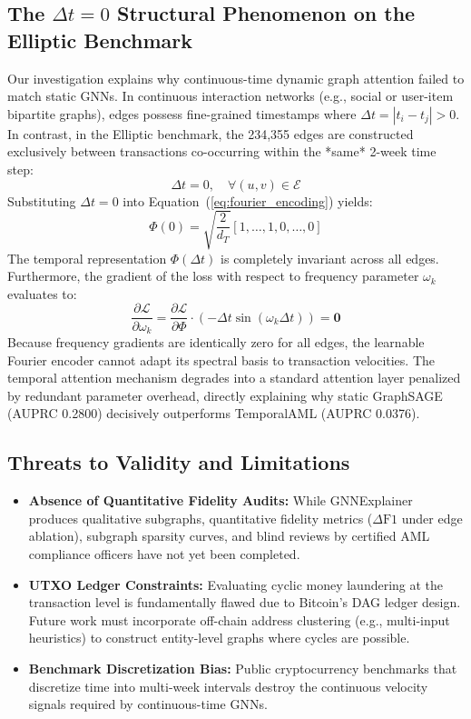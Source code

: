 \documentclass[conference]{IEEEtran}
\begin{document}
\subsection{The $\Delta t = 0$ Structural Phenomenon on the Elliptic Benchmark}
Our investigation explains why continuous-time dynamic graph attention failed to match static GNNs. In continuous interaction networks (e.g., social or user-item bipartite graphs), edges possess fine-grained timestamps where $\Delta t = |t_i - t_j| > 0$. In contrast, in the Elliptic benchmark, the 234,355 edges are constructed exclusively between transactions co-occurring within the *same* 2-week time step:
\begin{equation}
\Delta t = 0, \quad \forall (u, v) \in \mathcal{E}
\end{equation}
Substituting $\Delta t = 0$ into Equation~(\ref{eq:fourier_encoding}) yields:
\begin{equation}
\Phi(0) = \sqrt{\frac{2}{d_T}} [1, \dots, 1, 0, \dots, 0]
\end{equation}
The temporal representation $\Phi(\Delta t)$ is completely invariant across all edges. Furthermore, the gradient of the loss with respect to frequency parameter $\omega_k$ evaluates to:
\begin{equation}
\frac{\partial \mathcal{L}}{\partial \omega_k} = \frac{\partial \mathcal{L}}{\partial \Phi} \cdot \left( -\Delta t \sin(\omega_k \Delta t) \right) = \mathbf{0}
\end{equation}
Because frequency gradients are identically zero for all edges, the learnable Fourier encoder cannot adapt its spectral basis to transaction velocities. The temporal attention mechanism degrades into a standard attention layer penalized by redundant parameter overhead, directly explaining why static GraphSAGE (AUPRC 0.2800) decisively outperforms TemporalAML (AUPRC 0.0376).

\subsection{Threats to Validity and Limitations}
\begin{itemize}
    \item \textbf{Absence of Quantitative Fidelity Audits:} While GNNExplainer produces qualitative subgraphs, quantitative fidelity metrics ($\Delta \text{F1}$ under edge ablation), subgraph sparsity curves, and blind reviews by certified AML compliance officers have not yet been completed.
    \item \textbf{UTXO Ledger Constraints:} Evaluating cyclic money laundering at the transaction level is fundamentally flawed due to Bitcoin's DAG ledger design. Future work must incorporate off-chain address clustering (e.g., multi-input heuristics) to construct entity-level graphs where cycles are possible.
    \item \textbf{Benchmark Discretization Bias:} Public cryptocurrency benchmarks that discretize time into multi-week intervals destroy the continuous velocity signals required by continuous-time GNNs.
\end{itemize}
\end{document}
